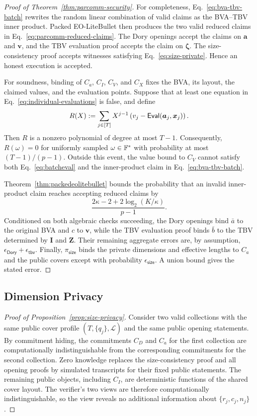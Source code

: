 \begin{proof}[Proof of Theorem~\ref{thm:parcomm-security}]
For completeness, Eq.~\eqref{eq:bva-tbv-batch} rewrites the random linear
combination of valid claims as the BVA--TBV inner product.  Packed
EO-LiteBullet then produces the two valid reduced claims in
Eq.~\eqref{eq:parcomm-reduced-claims}.  The Dory openings accept the claims on
$\bm a$ and $\bm v$, and the TBV evaluation proof accepts the claim on
$\bm\zeta$.  The size-consistency proof accepts witnesses satisfying
Eq.~\eqref{eq:size-private}.  Hence an honest execution is accepted.

For soundness, binding of $C_a$, $C_I$, $C_V$, and $C_X$ fixes the BVA, its
layout, the claimed values, and the evaluation points.  Suppose that at least
one equation in Eq.~\eqref{eq:individual-evaluations} is false, and define
\[
  R(X):=\sum_{j\in[T]}X^{j-1}
  \left(v_j-\mathsf{Eval}(\bm a_j, \bm x_j)\right).
\]
Then $R$ is a nonzero polynomial of degree at most $T-1$.  Consequently,
$R(\omega)=0$ for uniformly sampled $\omega\in{\mathbb{F}}^*$ with probability at
most $(T-1)/(p-1)$.  Outside this event, the value bound to $C_V$ cannot satisfy
both Eq.~\eqref{eq:batcheval} and the inner-product claim in
Eq.~\eqref{eq:bva-tbv-batch}.

Theorem~\ref{thm:packedeolitebullet} bounds the probability that an invalid
inner-product claim reaches accepting reduced claims by
\[
  \frac{2\kappa-2+2\log_2(K/\kappa)}{p-1}.
\]
Conditioned on both algebraic checks succeeding, the Dory openings bind
$\bar a$ to the original BVA and $c$ to $\bm v$, while the TBV evaluation proof
binds $\bar b$ to the TBV determined by $\bm I$ and $\bm Z$.  Their remaining
aggregate errors are, by assumption,
$\epsilon_{\mathsf{Dory}}+\epsilon_{\mathsf{tbv}}$.  Finally,
$\pi_{\mathsf{size}}$ binds the private dimensions and effective lengths to
$C_a$ and the public covers except with probability
$\epsilon_{\mathsf{size}}$.  A union bound gives the stated error.
\end{proof}

\subsection{Dimension Privacy}
\label{appx:proof-size-privacy}

\begin{proof}[Proof of Proposition~\ref{prop:size-privacy}]
Consider two valid collections with the same public cover profile
$(T,\{q_j\},\mathcal L)$ and the same public opening statements.  By commitment
hiding, the commitments $C_D$ and $C_a$ for the first collection are
computationally indistinguishable from the corresponding commitments for the
second collection.  Zero knowledge replaces the size-consistency proof and all
opening proofs by simulated transcripts for their fixed public statements.
The remaining public objects, including $C_I$, are deterministic functions of
the shared cover layout.  The verifier's two views are therefore
computationally indistinguishable, so the view reveals no additional
information about $\{r_j,c_j,n_j\}$.
\end{proof}

